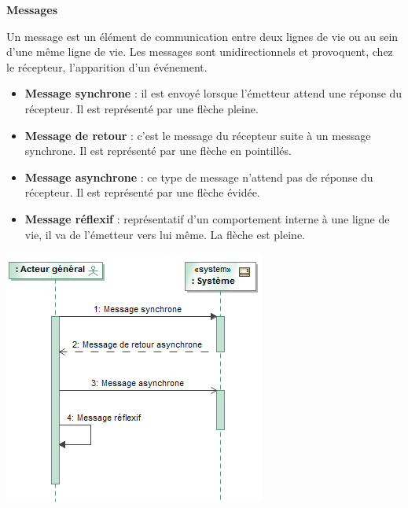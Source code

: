 \documentclass[10pt]{article}
\begin{document}
\begin{defi}
\textbf{Messages}

Un message est un élément de communication entre deux lignes de vie ou au sein d'une même ligne de vie. Les messages sont unidirectionnels et provoquent, chez le récepteur, l'apparition d'un événement. 
\begin{minipage}[c]{.65\linewidth} 
\begin{itemize}
\item \textbf{Message synchrone} : il est envoyé lorsque l'émetteur attend une réponse du récepteur. Il est représenté par une flèche pleine.
\item \textbf{Message de retour} : c'est le message du récepteur suite à un message synchrone. Il est représenté par une flèche en pointillés.
\item \textbf{Message asynchrone} : ce type de message n'attend pas de réponse du récepteur. Il est représenté par une flèche évidée.
\item \textbf{Message réflexif} : représentatif d'un comportement interne à une ligne de vie, il va de l'émetteur vers lui même. La flèche est pleine.
\end{itemize}
\end{minipage} \hfill
\begin{minipage}[c]{.3\linewidth} 
\begin{center}
\includegraphics[width=.95\textwidth]{images/Messages}
\end{center}
\end{minipage}
\end{defi}
\end{document}
